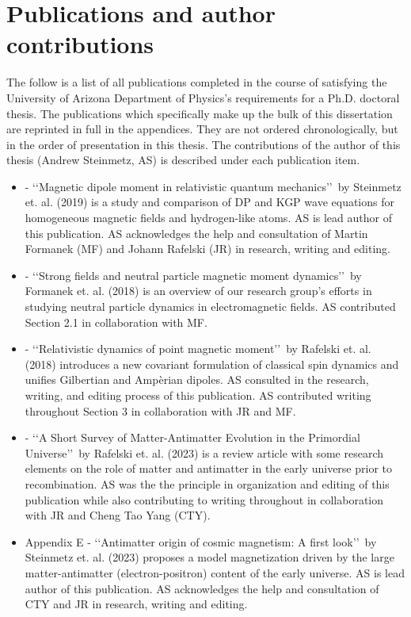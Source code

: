 \section{Publications and author contributions}
\label{sec:pubs}
The follow is a list of all publications completed in the course of satisfying the University of Arizona Department of Physics's requirements for a Ph.D. doctoral thesis. The publications which specifically make up the bulk of this dissertation are reprinted in full in the appendices. They are not ordered chronologically, but in the order of presentation in this thesis. The contributions of the author of this thesis (Andrew Steinmetz, AS) is described under each publication item.
\begin{itemize}
    \item {} - \lq\lq Magnetic dipole moment in relativistic quantum mechanics\rq\rq\ by Steinmetz et. al. (2019) is a study and comparison of DP and KGP wave equations for homogeneous magnetic fields and hydrogen-like atoms. AS is lead author of this publication. AS acknowledges the help and consultation of Martin Formanek (MF) and Johann Rafelski (JR) in research, writing and editing.
    \item {} - \lq\lq Strong fields and neutral particle magnetic moment dynamics\rq\rq\ by Formanek et. al. (2018) is an overview of our research group's efforts in studying neutral particle dynamics in electromagnetic fields. AS contributed Section 2.1 in collaboration with MF.
    \item {} - \lq\lq Relativistic dynamics of point magnetic moment\rq\rq\ by Rafelski et. al. (2018) introduces a new covariant formulation of classical spin dynamics and unifies Gilbertian and Amp{\`e}rian dipoles. AS consulted in the research, writing, and editing process of this publication. AS contributed writing throughout Section 3 in collaboration with JR and MF.
    \item {} - \lq\lq A Short Survey of Matter-Antimatter Evolution in the Primordial Universe\rq\rq\ by Rafelski et. al. (2023) is a review article with some research elements on the role of matter and antimatter in the early universe prior to recombination. AS was the the principle in organization and editing of this publication while also contributing to writing throughout in collaboration with JR and Cheng Tao Yang (CTY).
    \item Appendix E - \lq\lq Antimatter origin of cosmic magnetism: A first look\rq\rq\ by Steinmetz et. al. (2023) proposes a model magnetization driven by the large matter-antimatter (electron-positron) content of the early universe. AS is lead author of this publication. AS acknowledges the help and consultation of CTY and JR in research, writing and editing.
\end{itemize}

